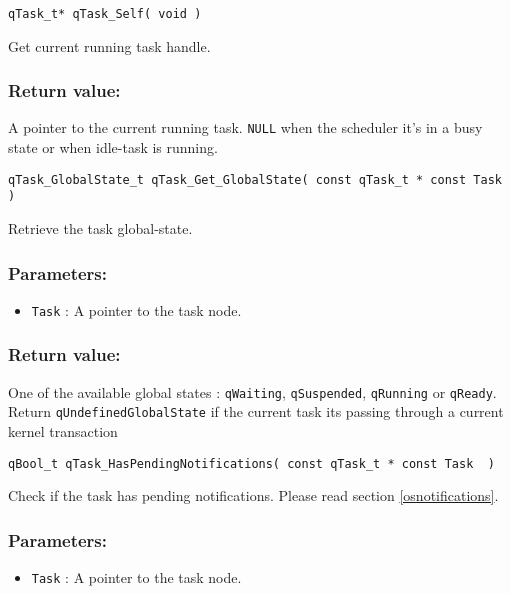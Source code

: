 \noindent\hrulefill


\begin{lstlisting}[style=CStyle]
qTask_t* qTask_Self( void )
\end{lstlisting}

Get current running task handle. 

\subsubsection*{Return value:}
A pointer to the current running task. \lstinline{NULL} when the scheduler it's in a busy state or when idle-task is running.


\noindent\hrulefill


\begin{lstlisting}[style=CStyle]
qTask_GlobalState_t qTask_Get_GlobalState( const qTask_t * const Task )
\end{lstlisting}

Retrieve the task global-state. 

\subsubsection*{Parameters:}
\begin{itemize}
    \item \lstinline{Task} : A pointer to the task node.
\end{itemize}


\subsubsection*{Return value:}
One of the available global states : \lstinline{qWaiting}, \lstinline{qSuspended}, \lstinline{qRunning} or \lstinline{qReady}.
Return \lstinline{qUndefinedGlobalState} if the current task its passing through a current kernel transaction

\noindent\hrulefill

\begin{lstlisting}[style=CStyle]
qBool_t qTask_HasPendingNotifications( const qTask_t * const Task  )
\end{lstlisting}

Check if the task has pending notifications. Please read section \ref{osnotifications}. 

\subsubsection*{Parameters:}
\begin{itemize}
    \item \lstinline{Task} : A pointer to the task node.
\end{itemize}

